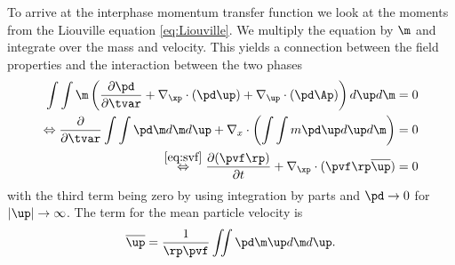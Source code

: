 To arrive at the interphase momentum transfer function we look at the moments from the Liouville equation \eqref{eq:Liouville}.
We multiply the equation by $\m$ and integrate over the mass and velocity. This yields a connection between the field properties and the interaction between the two phases
\begin{align*}
    \int \int \m \left( \dfrac{\partial \pd}{\partial \tvar} + \nabla_{\xp} \cdot (\pd \up) + \nabla_{\up} \cdot (\pd \Ap)\right) d \up d \m = 0 \\
    \Leftrightarrow
    \dfrac{\partial }{\partial \tvar} \int \int \pd \m d \m d \up + \nabla_x \cdot \left( \int \int m \pd \up d\up d \m \right) = 0\\
    \stackrel{\eqref{eq:svf}}{\Leftrightarrow} \dfrac{\partial (\pvf \rp )}{\partial t} + \nabla_{\xp} \cdot (\pvf \rp \overline{\up}) = 0    
\end{align*}
with the third term being zero by using integration by parts and $\pd \to 0$ for $\lvert \up \rvert \to \infty$. 
The term for the mean particle velocity is
\begin{equation*}
    \overline{\up} = \dfrac{1}{\rp \pvf}\MultiIntegral{2} \pd \m \up d\m d \up.
\end{equation*}

